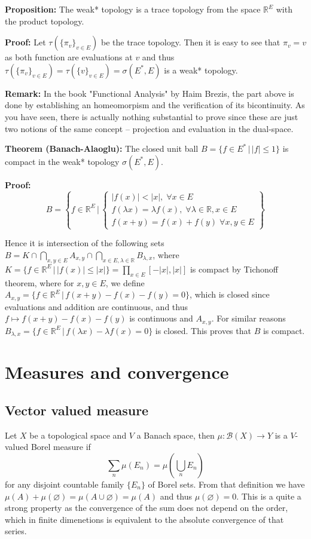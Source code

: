 \documentclass{article}
\begin{document}
\vspace{1ex}
\textbf{Proposition:} The weak* topology is a trace topology from the space
$\mathbb{R}^E$ with the product topology.

\vspace{1ex}
\textbf{Proof:} Let $\tau(\{\pi_v\}_{v\in E})$ be the trace topology. Then it
is easy to see that $\pi_v=v$ as both function are evaluations at $v$ and thus
$\tau(\{\pi_v\}_{v\in E})=\tau(\{v\}_{v\in E})=\sigma(E^*, E)$ is a weak*
topology.

\vspace{1ex}
\textbf{Remark:} In the book "Functional Analysis" by Haim Brezis, the part
above is done by establishing an homeomorpism and the verification of its bicontinuity.
As you have seen, there is actually nothing substantial to prove since these are 
just two notions of the same concept – projection and evaluation in the dual-space.

\vspace{1ex}
\textbf{Theorem (Banach-Alaoglu):} The closed unit ball $B=\{f\in E^*\,|\,|
f|\leq 1\}$ is compact in the weak* topology $\sigma(E^*, E)$.

\vspace{1ex}
\textbf{Proof:}
\[ B=\left\{f\in\mathbb{R}^E\,|\,
\begin{cases}
    |f(x)|<|x|,\;\forall x\in E\\
    f(\lambda x)=\lambda f(x),\;\forall\lambda\in\mathbb{R}, x\in E\\
    f(x+y)=f(x)+f(y)\;\forall x,y\in E
\end{cases}
\right\} \] 

Hence it is intersection of the following sets $B=K\cap\bigcap_{x,y\in E} A_{x,y}
\cap\bigcap_{x\in E, \lambda\in\mathbb{R}}B_{\lambda,x}$, where $K=\{f\in\mathbb
{R}^E\,|\,|f(x)|\leq|x|\}=\prod_{x\in E}[-|x|, |x|]$ is compact by Tichonoff
theorem, where for $x,y\in E$, we define $A_{x,y}=\{f\in\mathbb{R}^E\,|\,f(x+y)-
f(x)-f(y)=0\}$, which is closed since evaluations and addition are continuous, and
thus $f\mapsto f(x+y)-f(x)-f(y)$ is continuous and $A_{x,y}$. For similar
reasons $B_{\lambda, x}=\{f\in\mathbb{R}^E\,|\,f(\lambda x)-\lambda f(x)=0\}$ is
closed. This proves that $B$ is compact.


\section{Measures and convergence}

\subsection{Vector valued measure}
Let $X$ be a topological space and $V$ a Banach space, then $\mu:\mathcal{B}(X)
\rightarrow Y$ is a $V$-valued Borel measure if
\[\sum_n\mu(E_n)=\mu(\bigcup_n E_n)\]
for any disjoint countable family $\{E_n\}$ of Borel sets. From that definition
we have $\mu(A)+\mu(\varnothing)=\mu(A\cup\varnothing)=\mu(A)$ and thus 
$\mu(\varnothing)=0$. This is a quite a strong property as the convergence of
the sum does not depend on the order, which in finite dimenetions is equivalent
to the absolute convergence of that series.
\end{document}
